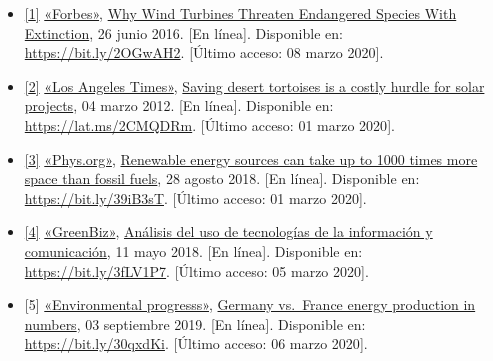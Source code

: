 \documentclass[12pt,spanish,Letterpaper,openany]{book}
\newcommand{\spacetwomilis}{\vspace{2mm}}
\begin{document}
\begin{itemize}
\item
  \hypertarget{articulo06_ref01}{}

  \protect\hyperlink{articulo06_cross01}{{[}1{]}} \href{http://www.forbes.com/}{«Forbes»}, \href{https://www.forbes.com/sites/michaelshellenberger/2019/06/26/why-wind-turbines-threaten-endangered-species-with-extinction/\#63a07d1264b4}{Why Wind Turbines Threaten Endangered Species With Extinction}, 26 junio 2016. {[}En línea{]}. Disponible en: \url{https://bit.ly/2OGwAH2}. {[}Último acceso: 08 marzo 2020{]}.
\item
  \hypertarget{articulo06_ref02}{}

  \protect\hyperlink{articulo06_cross02}{{[}2{]}} \href{https://www.latimes.com}{«Los Angeles Times»}, \href{https://www.latimes.com/archives/la-xpm-2012-mar-04-la-me-solar-tortoise-20120304-story.html/}{Saving desert tortoises is a costly hurdle for solar projects}, 04 marzo 2012. {[}En línea{]}. Disponible en: \url{https://lat.ms/2CMQDRm}. {[}Último acceso: 01 marzo 2020{]}.
\item
  \hypertarget{articulo06_ref03}{}

  \protect\hyperlink{articulo06_cross03}{{[}3{]}} \href{https://phys.org/}{«Phys.org»}, \href{https://phys.org/news/2018-08-renewable-energy-sources-space-fossil.html}{Renewable energy sources can take up to 1000 times more space than fossil fuels}, 28 agosto 2018. {[}En línea{]}. Disponible en: \url{https://bit.ly/39iB3sT}. {[}Último acceso: 01 marzo 2020{]}.
  \spacetwomilis
\item
  \hypertarget{articulo06_ref04}{}

  \protect\hyperlink{articulo06_cross04}{{[}4{]}} \href{https://www.greenbiz.com/}{«GreenBiz»}, \href{https://www.greenbiz.com/article/what-will-happen-solar-panels-after-their-useful-lives-are-over}{Análisis del uso de tecnologías de la información y comunicación}, 11 mayo 2018. {[}En línea{]}. Disponible en: \url{https://bit.ly/3fLV1P7}. {[}Último acceso: 05 marzo 2020{]}.
  \spacetwomilis
\item
  \hypertarget{articulo06_ref05}{}

  {[}5{]} \href{http://environmentalprogress.org/}{«Environmental progresss»}, \href{http://environmentalprogress.org/germany}{Germany vs.~France energy production in numbers}, 03 septiembre 2019. {[}En línea{]}. Disponible en: \url{https://bit.ly/30qxdKi}. {[}Último acceso: 06 marzo 2020{]}.
\end{itemize}
\end{document}
